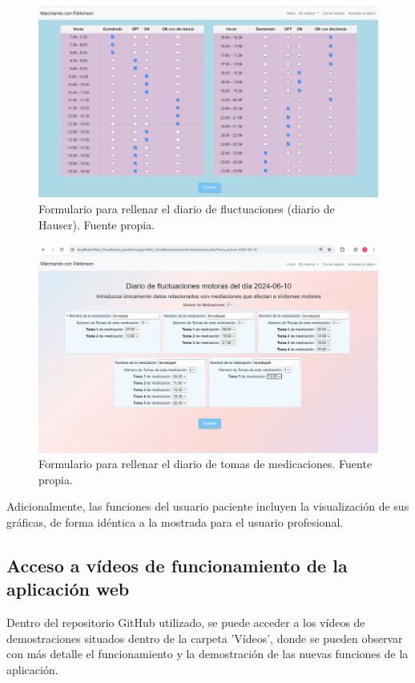 \begin{figure}[h]
    \centering
    \includegraphics[width=1\textwidth]{img/diariofluc.png}
    \caption{Formulario para rellenar el diario de fluctuaciones (diario de Hauser). Fuente propia.}
    \label{fig:diariofluc}
\end{figure}

\begin{figure}[h]
    \centering
    \includegraphics[width=1\textwidth]{img/diariotomas.png}
    \caption{Formulario para rellenar el diario de tomas de medicaciones. Fuente propia.}
    \label{fig:diariotomas}
\end{figure}
Adicionalmente, las funciones del usuario paciente incluyen la visualización de sus gráficas, de forma idéntica a la mostrada para el usuario profesional.
\subsection{Acceso a vídeos de funcionamiento de la aplicación web}
Dentro del repositorio GitHub utilizado, se puede acceder a los vídeos de demostraciones situados dentro de la carpeta 'Vídeos', donde se pueden observar con más detalle el funcionamiento y la demostración de las nuevas funciones de la aplicación.
     